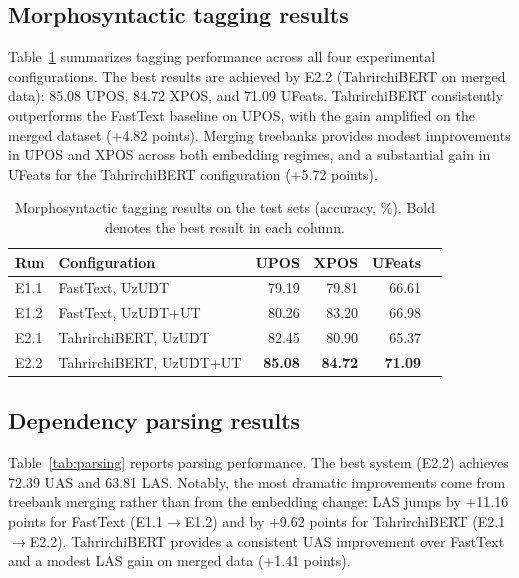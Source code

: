 \documentclass[runningheads]{llncs}
\begin{document}
\subsection{Morphosyntactic tagging results}
Table~\ref{tab:tagging} summarizes tagging performance across all four experimental configurations. The best results are achieved by E2.2 (TahrirchiBERT on merged data): 85.08 UPOS, 84.72 XPOS, and 71.09 UFeats. TahrirchiBERT consistently outperforms the FastText baseline on UPOS, with the gain amplified on the merged dataset (+4.82 points). Merging treebanks provides modest improvements in UPOS and XPOS across both embedding regimes, and a substantial gain in UFeats for the TahrirchiBERT configuration (+5.72 points).

\begin{table}[H]
\centering
\small
\begin{tabular*}{\textwidth}{@{\extracolsep{\fill}}llrrrr@{}}
\toprule
\textbf{Run} & \textbf{Configuration} & \textbf{UPOS} & \textbf{XPOS} & \textbf{UFeats} \\
\midrule
E1.1 & FastText, UzUDT & 79.19 & 79.81 & 66.61 \\
E1.2 & FastText, UzUDT+UT & 80.26 & 83.20 & 66.98 \\
E2.1 & TahrirchiBERT, UzUDT & 82.45 & 80.90 & 65.37 \\
E2.2 & TahrirchiBERT, UzUDT+UT & \textbf{85.08} & \textbf{84.72} & \textbf{71.09} \\
\bottomrule
\end{tabular*}
\caption{Morphosyntactic tagging results on the test sets (accuracy, \%). Bold denotes the best result in each column.}
\label{tab:tagging}
\end{table}

\subsection{Dependency parsing results}
Table~\ref{tab:parsing} reports parsing performance. The best system (E2.2) achieves 72.39 UAS and 63.81 LAS. Notably, the most dramatic improvements come from treebank merging rather than from the embedding change: LAS jumps by +11.16 points for FastText (E1.1$\to$E1.2) and by +9.62 points for TahrirchiBERT (E2.1$\to$E2.2). TahrirchiBERT provides a consistent UAS improvement over FastText and a modest LAS gain on merged data (+1.41 points).
\end{document}
